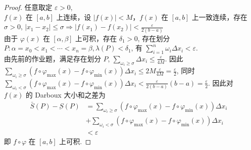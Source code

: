 \documentclass{article}
\begin{document}
\begin{proof}
    任意取定 $\varepsilon > 0$, \\
    $f(x)$ 在 $[a, b]$ 上连续，设 $\left\lvert f(x)\right\rvert < M$，$f(x)$ 在 $[a, b]$ 上一致连续，存在 $\sigma > 0$, $\left\lvert x_1 - x_2\right\rvert \leqslant \sigma \Rightarrow  \left\lvert f(x_1) - f(x_2)\right\rvert < \frac{\varepsilon}{2(b - a)} $ \\
    由于 $\varphi(x)$ 在 $[\alpha, \beta]$ 上可积，存在 $\delta_1 > 0$, 存在划分 $P: \alpha = x_0 < x_1 < \cdots < x_n = \beta, \lambda(P) < \delta_1$, 有 $\sum_{i = 1}^{n}\omega_i \Delta x_i < \varepsilon$. \\
    由先前的作业题，满足存在划分 $P$, $\sum_{\omega_i \geqslant \sigma} \Delta x_i \leqslant \frac{\varepsilon}{4M}$. 因此 $\sum_{\omega_i \geqslant \sigma}(f \circ \varphi_\mathrm{max} (x) - f \circ \varphi_\mathrm{min} (x)) \Delta x_i \leqslant 2M\frac{\varepsilon}{4M} = \frac{\varepsilon}{2}$, 同时 $\sum_{\omega_i < \sigma}(f \circ \varphi_\mathrm{max} (x) - f \circ \varphi_\mathrm{min} (x)) \Delta x_i < \frac{\varepsilon}{2(b - a)} (b - a) = \frac{\varepsilon}{2}$. 
    因此对 $f(x)$ 的 Darboux 大小和之差为
    \begin{align*}
        \bar{S}(P) - \underbar{S}(P) &= \sum_{\omega_i \geqslant \sigma}(f \circ \varphi_\mathrm{max} (x) - f \circ \varphi_\mathrm{min} (x)) \Delta x_i \\
        &  + \sum_{\omega_i < \sigma}(f \circ \varphi_\mathrm{max} (x) - f \circ \varphi_\mathrm{min} (x)) \Delta x_i \\
        & < \varepsilon 
    \end{align*}
    即 $f \circ \varphi$ 在 $[a, b]$ 上可积.
\end{proof}
\end{document}
